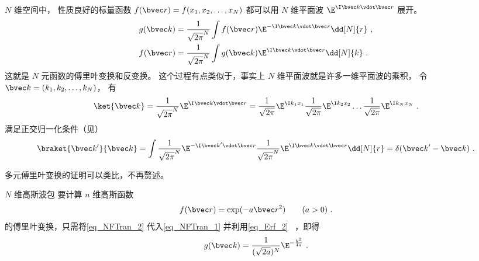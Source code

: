 

$N$ 维空间中， 性质良好的标量函数 $f(\bvec r) = f(x_1, x_2, \dots, x_N)$ 都可以用 $N$ 维平面波 $\E^{\I \bvec k\vdot \bvec r}$ 展开。
\begin{align}
g(\bvec k) &= \frac{1}{\sqrt{2\pi}^N} \int f(\bvec r) \E^{-\I \bvec k \vdot \bvec r} \dd[N]{r}\label{eq_NFTran_1}~,\\
f(\bvec r) &= \frac{1}{\sqrt{2\pi}^N} \int g(\bvec k) \E^{\I \bvec k \vdot \bvec r} \dd[N]{k}~.
\end{align}
这就是 $N$ 元函数的傅里叶变换和反变换。 这个过程有点类似于，事实上 $N$ 维平面波就是许多一维平面波的乘积， 令 $\bvec k = (k_1, k_2, \dots, k_N)$， 有
\begin{equation}
\ket{\bvec k} = \frac{1}{\sqrt{2\pi}^N}\E^{\I \bvec k \vdot \bvec r} = \frac{1}{\sqrt{2\pi}} \E^{\I k_1 x_1} \frac{1}{\sqrt{2\pi}} \E^{\I k_2 x_2} \dots \frac{1}{\sqrt{2\pi}} \E^{\I k_N x_N}~.
\end{equation}
满足正交归一化条件（见）
\begin{equation}
\braket{\bvec k'}{\bvec k} = \int \frac{1}{\sqrt{2\pi}^N}\E^{-\I \bvec k' \vdot \bvec r} \frac{1}{\sqrt{2\pi}^N}\E^{\I \bvec k \vdot \bvec r} \dd[N]{r} = \delta(\bvec k'- \bvec k)~.
\end{equation}

多元傅里叶变换的证明可以类比，不再赘述。

\begin{example}{$N$ 维高斯波包}
要计算 $n$ 维高斯函数
\begin{equation}\label{eq_NFTran_2}
f(\bvec r) = \exp(-a\bvec r^2) \qquad (a > 0)~.
\end{equation}
的傅里叶变换，只需将\autoref{eq_NFTran_2} 代入\autoref{eq_NFTran_1} 并利用\autoref{eq_Erf_2}~ ，即得
\begin{equation}
g(\bvec k) = \frac{1}{(\sqrt{2a})^N}\E^{-\frac{k^2}{4a}}~.
\end{equation}
\end{example}
